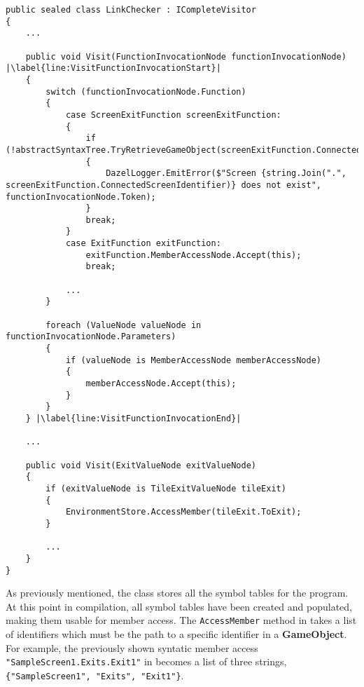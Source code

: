 \begin{lstlisting}[language=CSharp, caption={linker}, label={lst:LinkerClass},escapechar=|]
public sealed class LinkChecker : ICompleteVisitor
{
	... 

	public void Visit(FunctionInvocationNode functionInvocationNode) |\label{line:VisitFunctionInvocationStart}|
	{
		switch (functionInvocationNode.Function) 
		{
			case ScreenExitFunction screenExitFunction:
			{
				if (!abstractSyntaxTree.TryRetrieveGameObject(screenExitFunction.ConnectedScreenIdentifier))
				{
					DazelLogger.EmitError($"Screen {string.Join(".", screenExitFunction.ConnectedScreenIdentifier)} does not exist", functionInvocationNode.Token);
				}
				break;
			}
			case ExitFunction exitFunction:
				exitFunction.MemberAccessNode.Accept(this);
				break;
			
			...
		}

		foreach (ValueNode valueNode in functionInvocationNode.Parameters)
		{
			if (valueNode is MemberAccessNode memberAccessNode)
			{
				memberAccessNode.Accept(this);
			}
		}
	} |\label{line:VisitFunctionInvocationEnd}|

	...

	public void Visit(ExitValueNode exitValueNode)
	{
		if (exitValueNode is TileExitValueNode tileExit)
		{
			EnvironmentStore.AccessMember(tileExit.ToExit);
		} 

		...
	}	
}
\end{lstlisting}

As previously mentioned, the \abstractsemanticclass{} class stores all the symbol tables for the program. 
At this point in compilation, all symbol tables have been created and populated, making them usable for member access.
The \texttt{AccessMember} method in  takes a list of identifiers which must be the path to a specific identifier in a \textbf{GameObject}.
For example, the previously shown syntatic member access \texttt{"SampleScreen1.Exits.Exit1"} in  becomes a list of three strings, 
\texttt{\{"SampleScreen1", "Exits", "Exit1"\}}.

